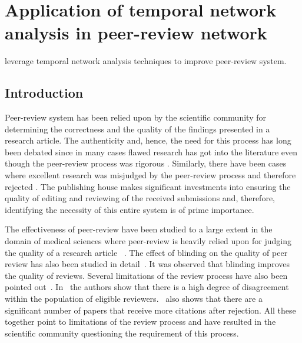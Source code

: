\chapter{Application of temporal network analysis in peer-review network}

leverage temporal network analysis techniques to improve peer-review system.

\section{Introduction}

Peer-review system has been relied upon by the scientific community for determining the correctness and the quality of the findings presented in a research article. The authenticity and, hence, the need for this process has long been debated since in many cases flawed research has got into the literature even though the peer-review process was rigorous \cite{bohannon2013s}. Similarly, there have been cases where excellent research was misjudged by the peer-review process and therefore rejected \cite{braatz2014papers}. The publishing house makes significant investments into ensuring the quality of editing and reviewing of the received submissions and, therefore, identifying the necessity of this entire system is of prime importance. 

The effectiveness of peer-review have been studied to a large extent in the domain of medical sciences where peer-review is heavily relied upon for judging the quality of a research article ~\cite{jefferson2006editorial,kassirer1994peer,
rennie1990editorial}. The effect of blinding on the quality of peer review has also been studied in detail~\cite{jefferson2002measuring, mcnutt1990effects}. It was observed that blinding improves the quality of reviews. Several limitations of the review process have also been pointed out~\cite{horrobin1990philosophical}. In~\cite{cole1981chance} the authors show that there is a high degree of disagreement within the population of eligible reviewers.~\cite{braatz2014papers} also shows that there are a significant number of papers that receive more citations after rejection. All these together point to limitations of the review process and have resulted in the scientific community questioning the requirement of this process. 

